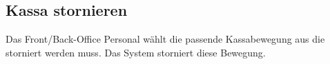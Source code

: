 \documentclass[../SubfileFeatures.tex]{subfiles}
\begin{document}
    \subsection{Kassa stornieren}
    Das Front/Back-Office Personal wählt die passende Kassabewegung aus die storniert werden muss.
    Das System storniert diese Bewegung. 
\end{document}

